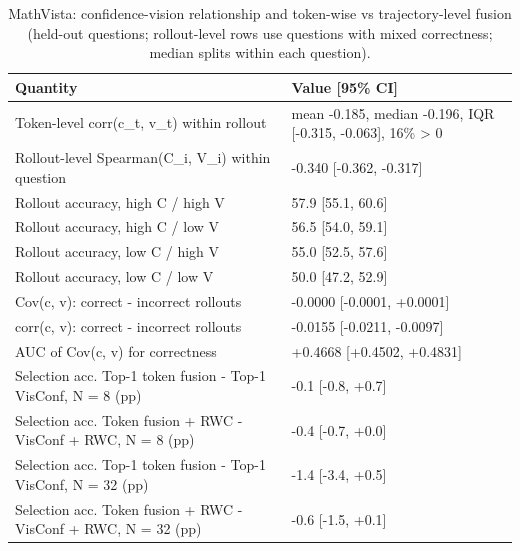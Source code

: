 \begin{table}[t]
\centering
\small
\caption{MathVista: confidence-vision relationship and token-wise vs trajectory-level fusion (held-out questions; rollout-level rows use questions with mixed correctness; median splits within each question).}
\label{tab:T6_confidence_vision}
\begin{tabular}{ll}
\toprule
Quantity & Value [95\% CI] \\
\midrule
Token-level corr(c\_t, v\_t) within rollout & mean -0.185, median -0.196, IQR [-0.315, -0.063], 16\% > 0 \\
Rollout-level Spearman(C\_i, V\_i) within question & -0.340 [-0.362, -0.317] \\
Rollout accuracy, high C / high V & 57.9 [55.1, 60.6] \\
Rollout accuracy, high C / low V & 56.5 [54.0, 59.1] \\
Rollout accuracy, low C / high V & 55.0 [52.5, 57.6] \\
Rollout accuracy, low C / low V & 50.0 [47.2, 52.9] \\
Cov(c, v): correct - incorrect rollouts & -0.0000 [-0.0001, +0.0001] \\
corr(c, v): correct - incorrect rollouts & -0.0155 [-0.0211, -0.0097] \\
AUC of Cov(c, v) for correctness & +0.4668 [+0.4502, +0.4831] \\
Selection acc. Top-1 token fusion - Top-1 VisConf, N = 8 (pp) & -0.1 [-0.8, +0.7] \\
Selection acc. Token fusion + RWC - VisConf + RWC, N = 8 (pp) & -0.4 [-0.7, +0.0] \\
Selection acc. Top-1 token fusion - Top-1 VisConf, N = 32 (pp) & -1.4 [-3.4, +0.5] \\
Selection acc. Token fusion + RWC - VisConf + RWC, N = 32 (pp) & -0.6 [-1.5, +0.1] \\
\bottomrule
\end{tabular}
\end{table}
